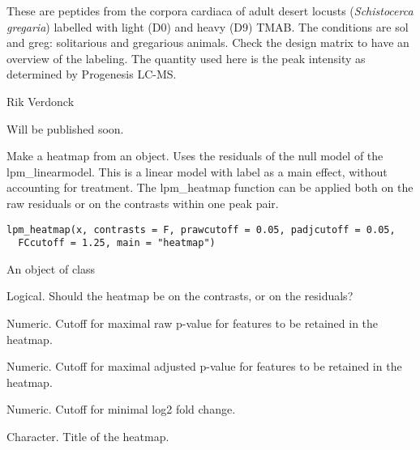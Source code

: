 \documentclass[letterpaper]{book}
\begin{document}
%
\begin{Details}\relax
These are peptides from the corpora cardiaca of adult desert locusts (\emph{Schistocerca gregaria}) labelled with light (D0) and heavy (D9) TMAB. The conditions are sol and greg: solitarious and gregarious animals. Check the design matrix  to have an overview of the labeling. The quantity used here is the peak intensity as determined by Progenesis LC-MS.
\end{Details}
%
\begin{Author}\relax
Rik Verdonck
\end{Author}
%
\begin{References}\relax
Will be published soon.
\end{References}
%
\begin{Description}\relax
Make a heatmap from an  object. Uses the residuals of the null model of the lpm\_linearmodel. This is a linear model with label as a main effect, without accounting for treatment. The lpm\_heatmap function can be applied both on the raw residuals or on the contrasts within one peak pair.
\end{Description}
%
\begin{Usage}
\begin{verbatim}
lpm_heatmap(x, contrasts = F, prawcutoff = 0.05, padjcutoff = 0.05,
  FCcutoff = 1.25, main = "heatmap")
\end{verbatim}
\end{Usage}
%
\begin{Arguments}
\begin{ldescription}
\item[\code{x}] An object of class 

\item[\code{contrasts}] Logical. Should the heatmap be on the contrasts, or on the residuals?

\item[\code{prawcutoff}] Numeric. Cutoff for maximal raw p-value for features to be retained in the heatmap.

\item[\code{padjcutoff}] Numeric. Cutoff for maximal adjusted p-value for features to be retained in the heatmap.

\item[\code{FCcutoff}] Numeric. Cutoff for minimal log2 fold change.

\item[\code{main}] Character. Title of the heatmap.
\end{ldescription}
\end{Arguments}
\end{document}
